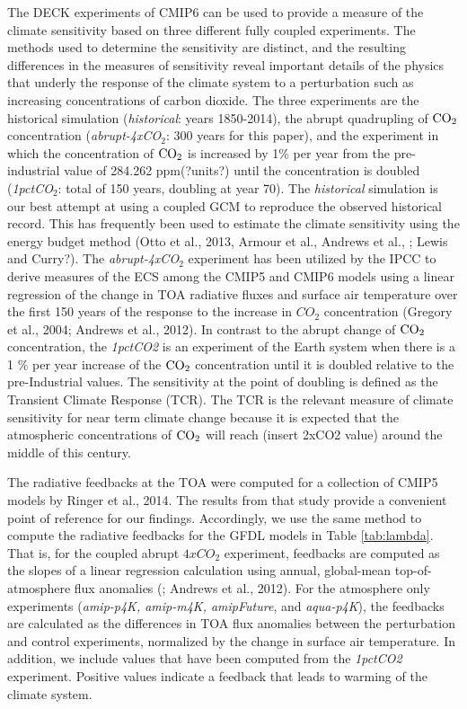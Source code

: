 \documentclass[draft]{agujournal2019}
\begin{document}
The DECK experiments of CMIP6 can be used to provide a measure of the climate sensitivity based on 
three different fully coupled experiments.  The methods used to determine the sensitivity are distinct, and the resulting 
differences in the measures of sensitivity reveal important details of the physics that underly the response
of the climate system to a perturbation such as increasing concentrations of carbon dioxide.  The three 
experiments are the historical simulation (\textit{historical}: years 1850-2014),  the abrupt quadrupling of 
$\rm{CO}_2$ concentration (\textit{abrupt-4xCO$_2$}: 300 years for this paper), and the experiment in 
which the concentration of $\rm{CO}_2$ is increased by 1\%  per year from the pre-industrial value of 
284.262 ppm(?units?) until the concentration is doubled  (\textit{1pctCO$_2$}: total of 150 years, doubling at year 70).  
The \textit{historical} simulation is our best attempt at using a coupled GCM to reproduce the 
observed historical record.  This has frequently been used to estimate the climate sensitivity using the 
energy budget method 
(Otto et al., 2013, Armour et al., Andrews et al., ; Lewis and Curry?).  
The \textit{abrupt-4xCO$_2$} experiment has been utilized by the IPCC to derive measures of the 
ECS among the CMIP5 and CMIP6 models using a linear regression of the change in TOA radiative fluxes 
and surface air temperature over the first 150 years of the response to the increase in $CO_2$ 
concentration (Gregory et al., 2004; Andrews et al., 2012).  In contrast to the abrupt change of 
$\rm{CO}_2$ concentration, the \textit{1pctCO2} is an experiment of the Earth system when 
there is a  1 \% per year increase of the $\rm{CO}_2$ concentration until it is doubled relative to the 
pre-Industrial values.  The sensitivity at the point of doubling is defined 
as the Transient Climate Response (TCR).  The TCR is the relevant measure of climate sensitivity for 
near term climate change because it is expected that the atmospheric concentrations of $\rm{CO}_2$ 
will reach (insert 2xCO2 value) around the middle of this century.         

The radiative feedbacks at the TOA were computed for a collection of CMIP5 models by Ringer et al., 2014.  
The results from that study provide a convenient point of reference for our findings.  
Accordingly, we use the same method to compute the radiative feedbacks for the GFDL models in Table \ref{tab:lambda}.  
That is, for the coupled abrupt $4xCO_{2}$ experiment, feedbacks are computed as  
the slopes of a linear regression calculation using annual, global-mean top-of-atmosphere flux anomalies 
(\cite{Gregory_etal_2004}; Andrews et al., 2012).  For the atmosphere only experiments 
(\textit{amip-p4K, amip-m4K, amipFuture}, and \textit{aqua-p4K}), the feedbacks are calculated as the 
differences in TOA flux anomalies between the perturbation and control experiments, normalized 
by the change in surface air temperature.  In addition, we include values that have been computed from the 
\textit{1pctCO2} experiment.   Positive values indicate a feedback that leads to warming of the climate system.   
\end{document}
